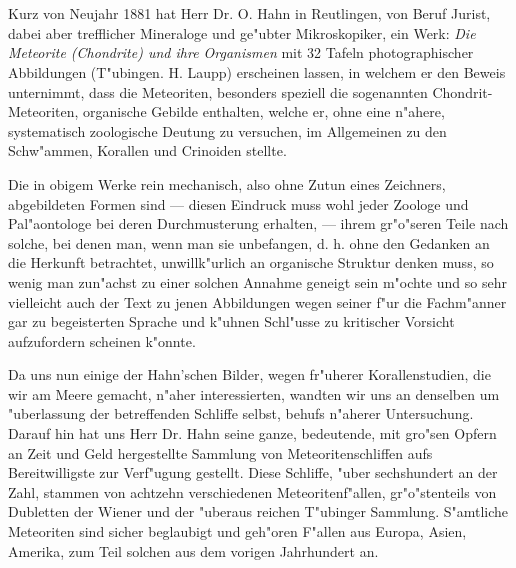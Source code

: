 \documentclass[a4paper, 11pt, oneside]{article}
\begin{document}
\section*{}
\paragraph{}
Kurz von Neujahr 1881 hat Herr Dr. O. Hahn in Reutlingen, von Beruf Jurist, dabei aber trefflicher Mineraloge und ge"ubter Mikroskopiker, ein Werk: \emph{Die Meteorite (Chondrite) und ihre Organismen} mit 32 Tafeln photographischer Abbildungen (T"ubingen. H. Laupp) erscheinen lassen, in welchem er den Beweis unternimmt, dass die Meteoriten, besonders speziell die sogenannten Chondrit-Meteoriten, organische Gebilde enthalten, welche er, ohne eine n"ahere, systematisch zoologische Deutung zu versuchen, im Allgemeinen zu den Schw"ammen, Korallen und Crinoiden stellte.

Die in obigem Werke rein mechanisch, also ohne Zutun eines Zeichners, abgebildeten Formen sind --- diesen Eindruck muss wohl jeder Zoologe und Pal"aontologe bei deren Durchmusterung erhalten, --- ihrem gr"o"seren Teile nach solche, bei denen man, wenn man sie unbefangen, d. h. ohne den Gedanken an die Herkunft betrachtet, unwillk"urlich an organische Struktur denken muss, so wenig man zun"achst zu einer solchen Annahme geneigt sein m"ochte und so sehr vielleicht auch der Text zu jenen Abbildungen wegen seiner f"ur die Fachm"anner gar zu begeisterten Sprache und k"uhnen Schl"usse zu kritischer Vorsicht aufzufordern scheinen k"onnte.

Da uns nun einige der Hahn'schen Bilder, wegen fr"uherer Korallenstudien, die wir am Meere gemacht, n"aher interessierten, wandten wir uns an denselben um "uberlassung der betreffenden Schliffe selbst, behufs n"aherer Untersuchung. Darauf hin hat uns Herr Dr. Hahn seine ganze, bedeutende, mit gro"sen Opfern an Zeit und Geld hergestellte Sammlung von Meteoritenschliffen aufs Bereitwilligste zur Verf"ugung gestellt. Diese Schliffe, "uber sechshundert an der Zahl, stammen von achtzehn verschiedenen Meteoritenf"allen, gr"o"stenteils von Dubletten der Wiener und der "uberaus reichen T"ubinger Sammlung. S"amtliche Meteoriten sind sicher beglaubigt und geh"oren F"allen aus Europa, Asien, Amerika, zum Teil solchen aus dem vorigen Jahrhundert an.
\end{document}

